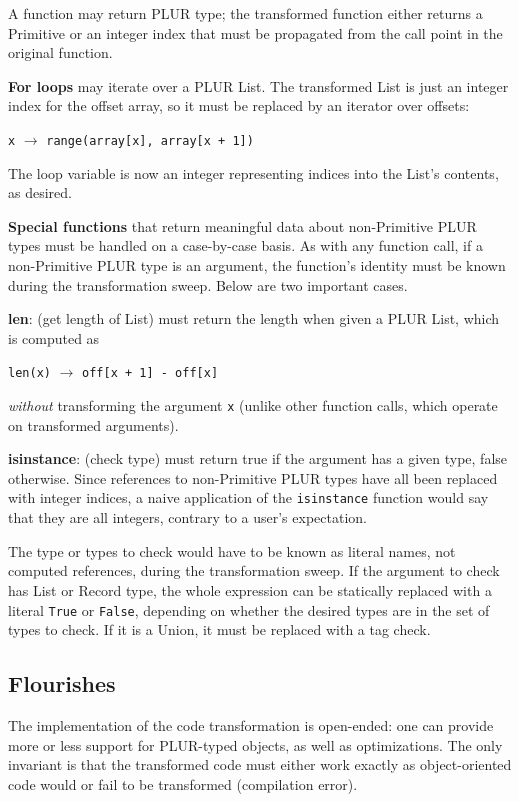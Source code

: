\documentclass[10pt, conference, compsocconf]{IEEEtran}
\begin{document}
A function may return PLUR type; the transformed function either returns a Primitive or an integer index that must be propagated from the call point in the original function.

{\bf For loops} may iterate over a PLUR List. The transformed List is just an integer index for the offset array, so it must be replaced by an iterator over offsets:
\begin{center}
{\tt x} $\to$ {\tt range(array[x], array[x + 1])}
\end{center}
The loop variable is now an integer representing indices into the List's contents, as desired.

{\bf Special functions} that return meaningful data about non-Primitive PLUR types must be handled on a case-by-case basis. As with any function call, if a non-Primitive PLUR type is an argument, the function's identity must be known during the transformation sweep. Below are two important cases.

{\bf len}: (get length of List) must return the length when given a PLUR List, which is computed as
\begin{center}
{\tt len(x)} $\to$ {\tt off[x + 1] - off[x]}
\end{center}
{\it without} transforming the argument {\tt x} (unlike other function calls, which operate on transformed arguments).

{\bf isinstance}: (check type) must return true if the argument has a given type, false otherwise. Since references to non-Primitive PLUR types have all been replaced with integer indices, a naive application of the {\tt isinstance} function would say that they are all integers, contrary to a user's expectation.

The type or types to check would have to be known as literal names, not computed references, during the transformation sweep. If the argument to check has List or Record type, the whole expression can be statically replaced with a literal {\tt True} or {\tt False}, depending on whether the desired types are in the set of types to check. If it is a Union, it must be replaced with a tag check.

\subsection{Flourishes}

The implementation of the code transformation is open-ended: one can provide more or less support for PLUR-typed objects, as well as optimizations. The only invariant is that the transformed code must either work exactly as object-oriented code would or fail to be transformed (compilation error).
\end{document}
